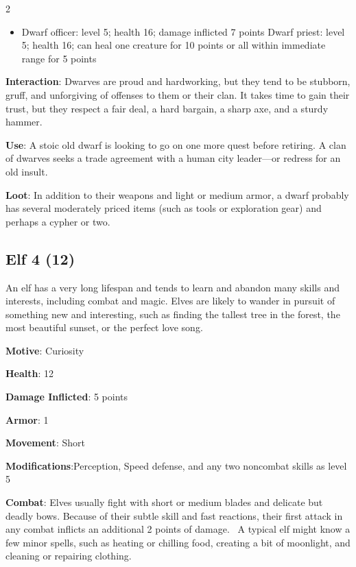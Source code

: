 \begin{multicols}{2}
\begin{itemize}
\item Dwarf officer: level 5; health 16; damage inflicted 7 points Dwarf priest: level 5; health 16; can heal one creature for 10 points or all within immediate range for 5 points
\end{itemize}

\textbf{Interaction}: Dwarves are proud and hardworking, but they tend to be stubborn, gruff, and unforgiving of offenses to them or their clan. It takes time to gain their trust, but they respect a fair deal, a hard bargain, a sharp axe, and a sturdy hammer. 

\textbf{Use}: A stoic old dwarf is looking to go on one more quest before retiring. A clan of dwarves seeks a trade agreement with a human city leader—or redress for an old insult.

\textbf{Loot}: In addition to their weapons and light or medium armor, a dwarf probably has several moderately priced items (such as tools or exploration gear) and perhaps a cypher or two.

\subsection{Elf 4 (12)}

An elf has a very long lifespan and tends to learn and abandon many skills and interests, including combat and magic. Elves are likely to wander in pursuit of something new and interesting, such as finding the tallest tree in the forest, the most beautiful sunset, or the perfect love song. 

\textbf{Motive}: Curiosity 

\textbf{Health}: 12 

\textbf{Damage Inflicted}: 5 points 

\textbf{Armor}: 1 

\textbf{Movement}: Short 

\textbf{Modifications}:Perception, Speed defense, and any two noncombat skills as level 5 

\textbf{Combat}: Elves usually fight with short or medium blades and delicate but deadly bows. Because of their subtle skill and fast reactions, their first attack in any combat inflicts an additional 2 points of damage. 
A typical elf might know a few minor spells, such as heating or chilling food, creating a bit of moonlight, and cleaning or repairing clothing.


\end{multicols}
